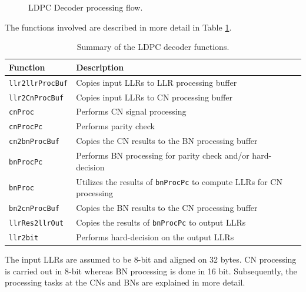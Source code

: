 \documentclass{article}
\begin{document}
\begin{figure}[ht]

  \caption{LDPC Decoder processing flow.}
\end{figure}

The functions involved are described in more detail in Table \ref{tab:sum_func}.

\begin{table}[ht]
  \centering
  \begin{tabular}{ll}
    \toprule
    \textbf{Function} & \textbf{Description} \\
    \midrule
    \texttt{llr2llrProcBuf} & Copies input LLRs to LLR processing buffer \\
    \texttt{llr2CnProcBuf}  & Copies input LLRs to CN  processing buffer \\
    \texttt{cnProc}         & Performs CN signal processing \\
    \texttt{cnProcPc}       & Performs parity check \\
    \texttt{cn2bnProcBuf}   & Copies the CN results to the BN processing buffer \\
    \texttt{bnProcPc}       & Performs BN processing for parity check and/or hard-decision \\
    \texttt{bnProc}         & Utilizes the results of \texttt{bnProcPc} to compute LLRs for CN processing \\
    \texttt{bn2cnProcBuf}   & Copies the BN results to the CN processing buffer \\
    \texttt{llrRes2llrOut}  & Copies the results of \texttt{bnProcPc} to output LLRs \\
    \texttt{llr2bit}        & Performs hard-decision on the output LLRs \\
    \bottomrule
  \end{tabular}
  \caption{Summary of the LDPC decoder functions.}
  \label{tab:sum_func}
\end{table}

The input LLRs are assumed to be 8-bit and aligned on 32 bytes. CN processing is carried out in 8-bit whereas BN processing is done in 16 bit. Subsequently, the processing tasks at the CNs and BNs are explained in more detail.
\end{document}
